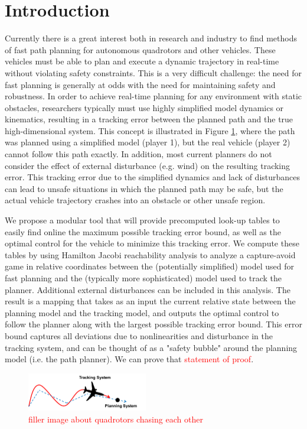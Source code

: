 \section{Introduction}
 Currently there is a great interest both in research and industry to find methods of fast path planning for autonomous quadrotors and other vehicles. These vehicles must be able to plan and execute a dynamic trajectory in real-time without violating safety constraints. This is a very difficult challenge: the need for fast planning is generally at odds with the need for maintaining safety and robustness. In order to achieve real-time planning for any environment with static obstacles, researchers typically must use highly simplified model dynamics or kinematics, resulting in a tracking error between the planned path and the true high-dimensional system. This concept is illustrated in Figure \ref{fig:chasing}, where the path was planned using a simplified model (player 1), but the real vehicle (player 2) cannot follow this path exactly. In addition, most current planners do not consider the effect of external disturbance (e.g. wind) on the resulting tracking error. This tracking error due to the simplified dynamics and lack of disturbances can lead to unsafe situations in which the planned path may be safe, but the actual vehicle trajectory crashes into an obstacle or other unsafe region.

We propose a modular tool that will provide precomputed look-up tables to easily find online the maximum possible tracking error bound, as well as the optimal control for the vehicle to minimize this tracking error. We compute these tables by using Hamilton Jacobi reachability analysis to analyze a capture-avoid game in relative coordinates between the (potentially simplified) model used for fast planning and the (typically more sophisticated) model used to track the planner. Additional external disturbances can be included in this analysis. The result is a mapping that takes as an input the current relative state between the planning model and the tracking model, and outputs the optimal control to follow the planner along with the largest possible tracking error bound. This error bound captures all deviations due to nonlinearities and disturbance in the tracking system, and can be thought of as a "safety bubble" around the planning model (i.e. the path planner). We can prove that \textcolor{red}{statement of proof}. 

\begin{figure}
	\centering
	\includegraphics[width=0.47\textwidth]{fig/chasing}
	\caption{\textcolor{red}{filler image about quadrotors chasing each other}}
	\label{fig:chasing}
\end{figure}

